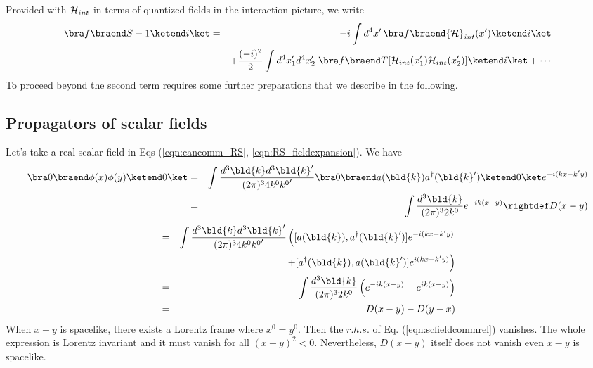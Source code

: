 Provided with ${\cal H}_{int}$ in terms of quantized fields in the interaction picture, 
we write 
\begin{eqnarray}
\bra f \braend S -1 \ketend i \ket
&=&
 -i \int d^4 x' \, \bra f \braend {\cal H}_{int}(x') \ketend i \ket
\nonumber\\
&&+
\frac{(-i)^2}{2}
\int d^4 x_1' d^4 x_2'
\;\bra f \braend T[ {\cal H}_{int}(x_1') {\cal H}_{int}(x_2')] \ketend i \ket
+ \cdots
\nonumber\\
\label{eqn:SmatrixPertSerCov}
\end{eqnarray}
To proceed beyond the second term requires some further preparations
that we describe in the following.

\subsection{Propagators of scalar fields}
Let's take a real scalar field in Eqs (\ref{eqn:cancomm_RS}, \ref{eqn:RS_fieldexpansion}).
We have
\begin{eqnarray}
\bra 0 \braend \phi(x) \phi(y) \ketend 0 \ket
&=&
\int \frac{d^3 \bld{k} d^3 \bld{k}'}{(2\pi)^3 4 k^0 {k^0}'} 
\bra 0 \braend a(\bld{k}) a^\dagger(\bld{k}') \ketend 0 \ket
e^{-i(kx - k'y)}
\nonumber\\
&=&
\int \frac{d^3 \bld{k} }{(2\pi)^3 2 k^0} 
e^{-ik(x - y)}
\rightdef
D(x-y)
\end{eqnarray}
\begin{eqnarray}
[\phi(x), \phi(y)]
&=&
\int \frac{d^3 \bld{k} d^3 \bld{k}'}{(2\pi)^3 4 k^0 {k^0}'} 
\left(
[a(\bld{k}), a^\dagger(\bld{k}')]e^{-i(kx - k'y)}
\right.
\nonumber\\
&&
\left.
\hspace{35mm}
+
[a^\dagger(\bld{k}), a(\bld{k}')]e^{i(kx - k'y)}
\right)
\nonumber\\
&=&
\int \frac{d^3 \bld{k} }{(2\pi)^3 2 k^0} 
\left(
e^{-ik(x - y)} - e^{ik(x - y)}
\right)
\nonumber\\
&=&
D(x-y) - D(y-x)
\label{eqn:scfieldcommrel}
\end{eqnarray}
When $x-y$ is spacelike, there exists a Lorentz frame where $x^0 = y^0$.
Then the $r.h.s.$ of Eq. (\ref{eqn:scfieldcommrel}) vanishes. 
The whole expression is Lorentz invariant and it must vanish for all $(x-y)^2 < 0$.
Nevertheless, $D(x-y)$ itself does not vanish even $x-y$ is spacelike.

